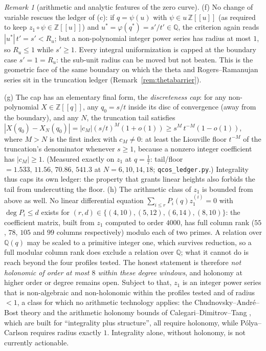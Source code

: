 \documentclass[11pt]{article}
\theoremstyle{plain}
\theoremstyle{definition}
\theoremstyle{remark}
\newtheorem{remark}[theorem]{Remark}
\newcommand{\Z}{\mathbb{Z}}
\newcommand{\Q}{\mathbb{Q}}
\begin{document}
\begin{remark}[arithmetic and analytic features of the zero curve]
(f) No change of variable rescues the ledger of (c): if $q=\psi(u)$ with $\psi\in u\,\Z[[u]]$ (as
required to keep $z_1\circ\psi\in\Z[[u]]$) and $u^\ast=\varphi(q^\ast)=s'/t'\in\Q$, the criterion
again reads $|u^\ast|\,t'=s'<R_u$; but a non-polynomial integer power series has radius at most $1$,
so $R_u\le1$ while $s'\ge1$. Every integral uniformization is capped at the boundary case
$s'=1=R_u$: the sub-unit radius can be moved but not beaten. This is the geometric face of the same
boundary on which the theta and Rogers--Ramanujan series sit in the truncation ledger
(Remark~\ref{rem:thetabarrier}).

(g) The cap has an elementary final form, the \emph{discreteness cap}: for any non-polynomial
$X\in\Z[[q]]$, any $q_0=s/t$ inside its disc of convergence (away from the boundary), and any $N$,
the truncation tail satisfies $|X(q_0)-X_N(q_0)|=|c_M|(s/t)^M(1+o(1))\ge s^M\,t^{-M}(1-o(1))$, where
$M>N$ is the first index with $c_M\ne0$: at least the Liouville floor $t^{-M}$ of the truncation's
denominator whenever $s\ge1$, because a nonzero integer coefficient has $|c_M|\ge1$. (Measured exactly on
$z_1$ at $q=\tfrac17$: tail/floor $=1.533,\,11.56,\,70.86,\,541.3$ at $N=6,10,14,18$;
\texttt{qcos\_ledger.py}.) Integrality thus
caps its own ledger: the property that grants linear heights also forbids the tail from undercutting
the floor. (h) The arithmetic class of $z_1$ is bounded from above as well. No linear differential
equation $\sum_{i\le r}P_i(q)z_1^{(i)}=0$ with $\deg P_i\le d$ exists for $(r,d)\in\{(4,10),
(5,12),(6,14),(8,10)\}$: the coefficient matrix, built from $z_1$ computed to order $4000$, has
full column rank ($55$, $78$, $105$ and $99$ columns respectively) modulo each of two primes.
A relation over $\Q(q)$ may be scaled to a primitive integer one, which survives reduction, so a
full modular column rank does exclude a relation over $\Q$; what it cannot do is reach beyond the
four profiles tested. The honest statement is therefore \emph{not holonomic of order at most $8$
within these degree windows}, and holonomy at higher order or degree remains open. Subject to
that, $z_1$ is an integer power series that is non-algebraic and non-holonomic within the profiles
tested and of radius $<1$, a class for which no arithmetic technology applies: the
Chudnovsky--Andr\'e--Bost theory and the arithmetic holonomy bounds of Calegari--Dimitrov--Tang
\cite{CDT}, which are built for ``integrality plus structure'', all require holonomy, while
P\'olya--Carlson \cite{Carlson1921,Polya1916} requires radius exactly $1$. Integrality alone,
without holonomy, is not currently actionable.


\end{remark}
\end{document}
